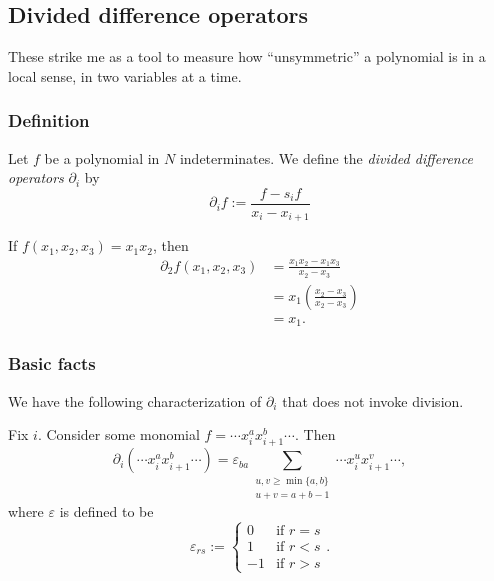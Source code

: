 \documentclass{article}
\begin{document}
\subsection{Divided difference operators}

These strike me as a tool to measure how ``unsymmetric'' a polynomial is in a local sense, in two variables at a time. 

\subsubsection{Definition}

\begin{definition}
    Let $f$ be a polynomial in $N$ indeterminates. 
    We define the \textit{divided difference operators} $\partial_i$ by 
    \begin{equation}
        \partial_i f := \frac{f-s_if}{x_i-x_{i+1}}
    \end{equation}
\end{definition}

\begin{example}
    If $f(x_1, x_2, x_3) = x_1x_2$, then
    \begin{align*}
        \partial_2 f(x_1,x_2,x_3) &= \frac{x_1x_2 - x_1x_3}{x_2 - x_3} \\
                                  &= x_1\left(\frac{x_2-x_3}{x_2-x_3}\right) \\
                                  &= x_1.
    \end{align*}
\end{example}

\subsubsection{Basic facts}

We have the following characterization of $\partial_i$ that does not invoke division.

\begin{lemma}
    Fix $i$. Consider some monomial $f = \cdots x_i^ax_{i+1}^b \cdots$. Then
    \[
        \partial_i(\cdots x_i^a x_{i+1}^b \cdots) = 
        \varepsilon_{ba}
        \sum_{\substack{u,v \geq \min\{a,b\} \\ u+v = a+b-1}} \cdots x_i^u x_{i+1}^v \cdots,
    \]
    where $\varepsilon$ is defined to be
    \[
        \varepsilon_{rs} := \begin{cases}
            0 & \text{if } r = s \\
            1 & \text{if } r < s \\
            -1 & \text{if }r > s 
        \end{cases}.
    \]
\end{lemma}
\end{document}
